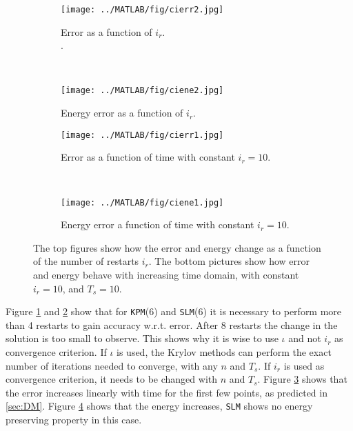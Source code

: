 \begin{figure}[H]
        \centering
        \begin{subfigure}[b]{0.3\textwidth}
                \texttt{[image: ../MATLAB/fig/cierr2.jpg]}
                \caption{ Error as a function of $i_r$. \\.}
                \label{fig:cierr2}
        \end{subfigure}
        ~
		\begin{subfigure}[b]{0.3\textwidth}
                \texttt{[image: ../MATLAB/fig/ciene2.jpg]}
                \caption{ Energy error as a function of $i_r$. }
                \label{fig:ciene2}
        \end{subfigure}    

        \begin{subfigure}[b]{0.3\textwidth}
                \texttt{[image: ../MATLAB/fig/cierr1.jpg]}
                \caption{ Error as a function of time with constant $i_r = 10$. }
                \label{fig:cierr1}
        \end{subfigure}
        ~
		\begin{subfigure}[b]{0.3\textwidth}
                \texttt{[image: ../MATLAB/fig/ciene1.jpg]}
                \caption{ Energy error a function of time with constant $i_r = 10$. }
                \label{fig:ciene1}
        \end{subfigure}
        \caption{ The top figures show how the error and energy change as a function of the number of restarts $i_r$. The bottom pictures show how error and energy behave with increasing time domain, with constant $i_r = 10$, and $T_s = 10$.}
        \label{fig:ci}
\end{figure}
\noindent Figure \ref{fig:cierr2} and \ref{fig:ciene2} show that for \texttt{KPM}(6) and \texttt{SLM}(6) it is necessary to perform more than 4 restarts to gain accuracy w.r.t. error. After 8 restarts the change in the solution is too small to observe. This shows why it is wise to use $\iota$ and not $i_r$ as convergence criterion. If $\iota$ is used, the Krylov methods can perform the exact number of iterations needed to converge, with any $n$ and $T_s$. If $i_r$ is used as convergence criterion, it needs to be changed with $n$ and $T_s$.
Figure \ref{fig:cierr1} shows that the error increases linearly with time for the first few points, as predicted in \ref{sec:DM}.
Figure \ref{fig:ciene1} shows that the energy increases, \texttt{SLM} shows no energy preserving property in this case.

